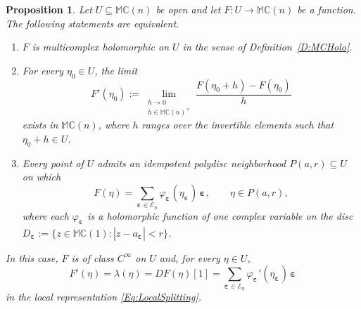 \documentclass[12pt]{amsart}
\theoremstyle{plain}
\newtheorem{proposition}[theorem]{Proposition}
\theoremstyle{definition}
\numberwithin{equation}{section}
\newcommand{\bep}[1]{\bm{\varepsilon_{#1}}}
\newcommand{\mC}{\mathbb{C}}
\newcommand{\mM}{\mathbb{M}}
\newcommand{\ra}{\rightarrow}
\begin{document}
    \begin{proposition}\label{P:DerivativeEquivalence}
    Let $U \subseteq \mM \mC(n)$ be open and let $F : U \ra \mM \mC(n)$ be a
    function. The following statements are equivalent.
        \begin{enumerate}[label=(\roman*)]
        \item $F$ is multicomplex holomorphic on $U$ in the sense of
        Definition~\ref{D:MCHolo}.
        \item For every $\eta_0 \in U$, the limit
            \begin{equation}\label{Eq:MCDerivative}
            F' (\eta_0 ) := \lim_{\substack{h \ra 0 \\ h \in \mM \mC(n)^\times}}
            \frac{ F (\eta_0 + h ) - F (\eta_0 )}{h} 
            \end{equation}
        exists in $\mM \mC(n)$, where $h$ ranges over the invertible elements
        such that $\eta_0 + h \in U$.
        \item Every point of $U$ admits an idempotent polydisc neighborhood
        $P ( a , r ) \subseteq U$ on which
            \begin{equation}\label{Eq:LocalSplitting}
            F (\eta ) = \sum_{\bep{} \in \mathcal{E}_n } \varphi_{\bep{}} ( \eta_{\bep{}} )\, \bep{} ,
            \qquad \eta \in P ( a , r ),
            \end{equation}
        where each $\varphi_{\bep{}}$ is a holomorphic function of one complex
        variable on the disc
        $D_{\bep{}} := \{ z \in \mM \mC(1) : | z - a_{\bep{}} | < r \}$.
        \end{enumerate}
    In this case, $F$ is of class $C^\infty$ on $U$ and, for every
    $\eta \in U$,
        \begin{equation}\label{Eq:DerivativeIdentification}
        F' (\eta ) = \lambda (\eta ) = DF (\eta ) [ 1 ]
        = \sum_{\bep{} \in \mathcal{E}_n} \varphi_{\bep{}} ' ( \eta_{\bep{}} )\, \bep{}
        \end{equation}
    in the local representation \eqref{Eq:LocalSplitting}.
    \end{proposition}
\end{document}
